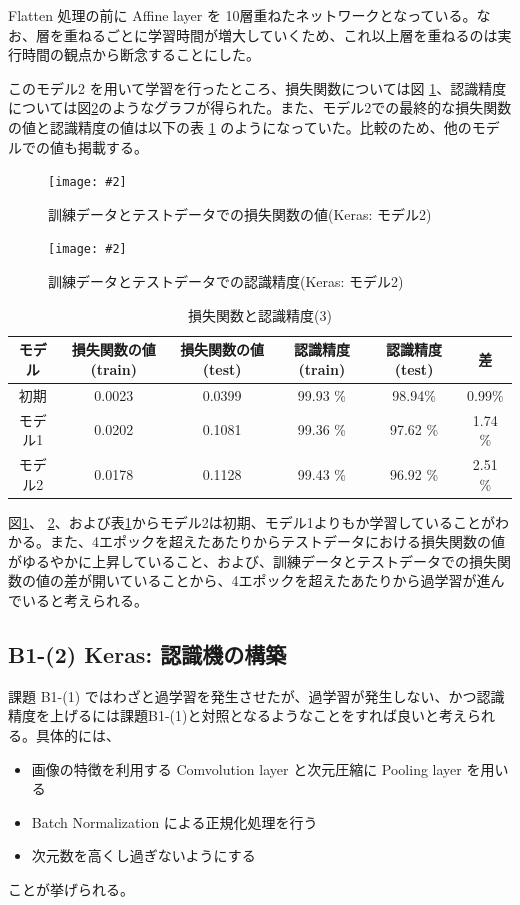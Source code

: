 \documentclass[a4paper,dvipdfmx]{jsarticle}
\newcommand{\image}[3]{
    \begin{figure}[H]
        \begin{center}
        \texttt{[image: \#2]}
        \end{center}
        \caption{#1}
        \label{#3}
    \end{figure}
}
\begin{document}
Flatten 処理の前に Affine layer を 10層重ねたネットワークとなっている。なお、層を重ねるごとに学習時間が増大していくため、これ以上層を重ねるのは実行時間の観点から断念することにした。

このモデル2 を用いて学習を行ったところ、損失関数については図 \ref{fig-B1-1-5}、認識精度については図\ref{fig-B1-1-6}のようなグラフが得られた。また、モデル2での最終的な損失関数の値と認識精度の値は以下の表 \ref{tableB1-3} のようになっていた。比較のため、他のモデルでの値も掲載する。

\image{訓練データとテストデータでの損失関数の値(Keras: モデル2)}{report_b1-1-5.png}{fig-B1-1-5}
\image{訓練データとテストデータでの認識精度(Keras: モデル2)}{report_b1-1-6.png}{fig-B1-1-6}

\begin{table}[H]
\begin{center}
\caption{損失関数と認識精度(3)}
  \begin{tabular}{|c|c|c||c|c|c|} \hline
    モデル & 損失関数の値(train) & 損失関数の値(test) & 認識精度(train) & 認識精度(test) & 差 \\ \hline \hline
    初期 & 0.0023 & 0.0399 & 99.93 \% & 98.94\% & 0.99\% \\ \hline
    モデル1 & 0.0202 & 0.1081 & 99.36 \% & 97.62 \% & 1.74 \% \\ \hline 
    モデル2 & 0.0178 & 0.1128 & 99.43 \% & 96.92 \% & 2.51 \% \\ \hline
  \end{tabular}
	\label{tableB1-3}
\end{center}
\end{table}

図\ref{fig-B1-1-5}、 \ref{fig-B1-1-6}、および表\ref{tableB1-3}からモデル2は初期、モデル1よりもか学習していることがわかる。また、4エポックを超えたあたりからテストデータにおける損失関数の値がゆるやかに上昇していること、および、訓練データとテストデータでの損失関数の値の差が開いていることから、4エポックを超えたあたりから過学習が進んでいると考えられる。

\subsection*{B1-(2) Keras: 認識機の構築}

課題 B1-(1) ではわざと過学習を発生させたが、過学習が発生しない、かつ認識精度を上げるには課題B1-(1)と対照となるようなことをすれば良いと考えられる。具体的には、
\begin{itemize}
\item 画像の特徴を利用する Comvolution layer と次元圧縮に Pooling layer を用いる
\item Batch Normalization による正規化処理を行う
\item 次元数を高くし過ぎないようにする
\end{itemize}
ことが挙げられる。
\end{document}
